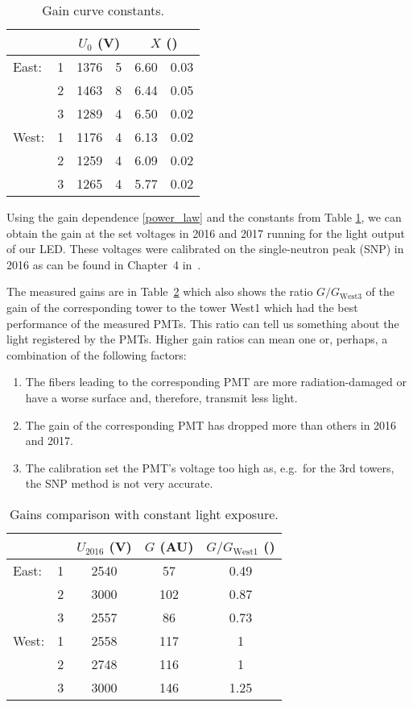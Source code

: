 \begin{table}[htb]
\caption{\label{gainTable}Gain curve constants.}
\begin{center}
\begin{tabular}{lcr@{ $\pm$ }lr@{ $\pm$ }l}
\toprule
&&\multicolumn{2}{c}{$U_0$ (V)}&\multicolumn{2}{c}{$X$ ()}\\
\midrule
East:&1&1376&5&6.60&0.03\\
     &2&1463&8&6.44&0.05\\
     &3&1289&4&6.50&0.02\\
\midrule
West:&1&1176&4&6.13&0.02\\
     &2&1259&4&6.09&0.02\\
     &3&1265&4&5.77&0.02\\
\bottomrule
\end{tabular}
\end{center}
\end{table}

Using the gain dependence \eqref{power_law} and the constants from Table \ref{gainTable}, we can obtain the gain at the set voltages in 2016 and 2017 running for the light output of our LED\@. These voltages were calibrated on the single-neutron peak (SNP) in 2016 as can be found in Chapter~4 in~\cite{ZDC_ops_manual}\@. 

The measured gains are in Table~\ref{glassTable} which also shows the ratio $G/G_\text{West3}$ of the gain of the corresponding tower to the tower West1 which had the best performance of the measured PMTs\@. This ratio can tell us something about the light registered by the PMTs. Higher gain ratios can mean one or, perhaps, a combination of the following factors:
\begin{enumerate}
\item The fibers leading to the corresponding PMT are more radiation-damaged or have a worse surface and, therefore, transmit less light.
\item The gain of the corresponding PMT has dropped more than others in 2016 and 2017.
\item The calibration set the PMT's voltage too high as, e.g.\ for the 3rd towers, the SNP method is not very accurate. 
\end{enumerate}


\begin{table}[htb]
\caption{\label{glassTable}Gains comparison with constant light exposure.}
\begin{center}
\begin{tabular}{lcccc}
\toprule
&&$U_\text{2016}$ (V)&$G$ (AU)& $G/G_\text{West1}$ ()\\
\midrule
East:&1&2540&57&0.49\\
&2&3000&102&0.87\\
&3&2557&86&0.73\\
\midrule
West:&1&2558&117&1\\
&2&2748&116&1\\
&3&3000&146&1.25\\
\bottomrule
\end{tabular}
\end{center}
\end{table}

